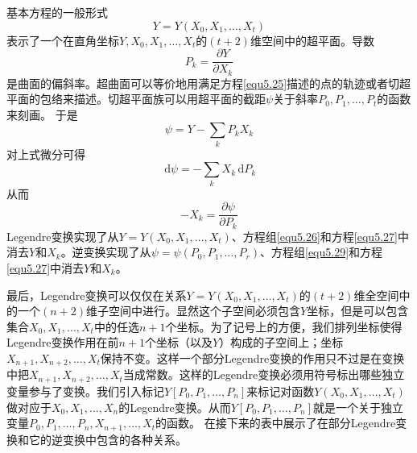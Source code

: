 基本方程的一般形式
\begin{equation}
\label{equ5.25}
	Y=Y(X_0,X_1,\dots,X_t)
\end{equation}
表示了一个在直角坐标$Y,X_0,X_1,\dots,X_t$的$(t+2)$维空间中的超平面。导数
\begin{equation}
\label{equ5.26}
	P_k=\frac{\partial Y}{\partial X_k}
\end{equation}
是曲面的偏斜率。超曲面可以等价地用满足方程\eqref{equ5.25}描述的点的轨迹或者切超平面的包络来描述。切超平面族可以用超平面的截距$\psi$关于斜率$P_0,P_1,\dots,P_t$的函数来刻画。
于是
\begin{equation}
\label{equ5.27}
	\psi=Y-\sum_kP_kX_k
\end{equation}
对上式微分可得
\begin{equation}
\label{equ5.28}
	\,\mathrm d\psi=-\sum_kX_k\,\mathrm dP_k
\end{equation}
从而
\begin{equation}
\label{equ5.29}
	-X_k = \frac{\partial \psi}{\partial P_k}
\end{equation}
Legendre变换实现了从$Y=Y(X_0,X_1,\dots,X_t)$、方程组\eqref{equ5.26}和方程\eqref{equ5.27}中消去$Y$和$X_k$。逆变换实现了从$\psi=\psi(P_0,P_1,\dots,P_r)$、方程组\eqref{equ5.29}和方程\eqref{equ5.27}中消去$Y$和$X_k$。

最后，Legendre变换可以仅仅在关系$Y=Y(X_0,X_1,\dots,X_t)$的$(t+2)$维全空间中的一个$(n+2)$维子空间中进行。显然这个子空间必须包含$Y$坐标，但是可以包含集合$X_0,X_1,\dots,X_t$中的任选$n+1$个坐标。为了记号上的方便，我们排列坐标使得Legendre变换作用在前$n+1$个坐标（以及$Y$）构成的子空间上；坐标$X_{n+1},X_{n+2},\dots,X_t$保持不变。这样一个部分Legendre变换的作用只不过是在变换中把$X_{n+1},X_{n+2},\dots,X_t$当成常数。这样的Legendre变换必须用符号标出哪些独立变量参与了变换。我们引入标记$Y[P_0,P_1,\dots,P_n]$来标记对函数$Y(X_0,X_1,\dots,X_t)$做对应于$X_0,X_1,\dots,X_n$的Legendre变换。从而$Y[P_0,P_1,\dots,P_n]$就是一个关于独立变量$P_0,P_1,\dots,P_n,X_{n+1},\dots,X_t$的函数。
在接下来的表中展示了在部分Legendre变换和它的逆变换中包含的各种关系。

